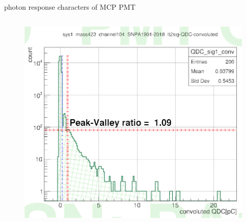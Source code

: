 \documentclass[11pt,compress,xcolor=x11names,UTF8]{beamer}
\begin{document}
\begin{frame}{photon response characters of MCP PMT }
\begin{columns}
\begin{column}{.5\textwidth}
\begin{figure}
\includegraphics[width=\textwidth]{figure/mcpnoise.png} %
\end{figure}
\end{column}
\end{columns}
\end{frame}
\end{document}
